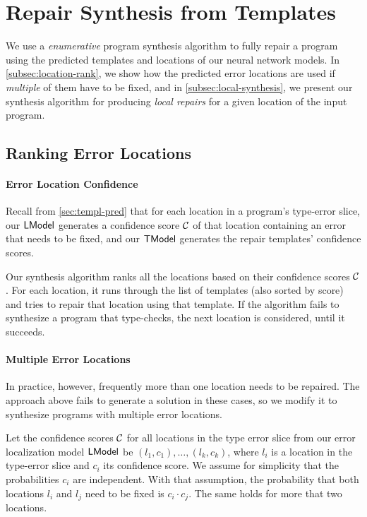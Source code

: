 \section{Repair Synthesis from Templates}
\label{sec:synthesis}
We use a \emph{enumerative} program synthesis algorithm to fully repair a
program using the predicted templates and locations of our neural network
models. In \autoref{subsec:location-rank}, we show how the predicted error
locations are used if \emph{multiple} of them have to be fixed, and in
\autoref{subsec:local-synthesis}, we present our synthesis algorithm for
producing \emph{local repairs} for a given location of the input program.

\subsection{Ranking Error Locations}
\label{subsec:location-rank}

\paragraph{Error Location Confidence}
Recall from \autoref{sec:templ-pred} that for each location in a program's
type-error slice, our
$\mathsf{LModel}$ generates a confidence score $\mathcal{C}$ of that location containing an
error that needs to be fixed, and our $\mathsf{TModel}$
generates the repair templates' confidence scores.

Our synthesis algorithm ranks all the locations based on their
confidence scores $\mathcal{C}$. For each location, it runs through the list
of templates (also sorted by score) and tries to repair that location using that
template. If the algorithm fails to synthesize a
program that type-checks, the next
location is considered, until it succeeds.

\paragraph{Multiple Error Locations}
In practice, however, frequently more than one location needs to
be repaired. The approach above fails to generate a solution
in these cases, so we modify it to synthesize programs with
multiple error locations.

Let the confidence scores $\mathcal{C}$ for all locations
in the type error slice from our error localization model $\mathsf{LModel}$ be
$(l_1, c_1), \dots, (l_k, c_k)$, where $l_i$ is a location in the type-error
slice and $c_i$ its confidence score. We assume for simplicity
that the probabilities $c_i$ are independent.
With that assumption, the probability that both locations $l_i$ and $l_j$
need to be fixed is $c_i \cdot c_j$. The same holds for more that two locations.

